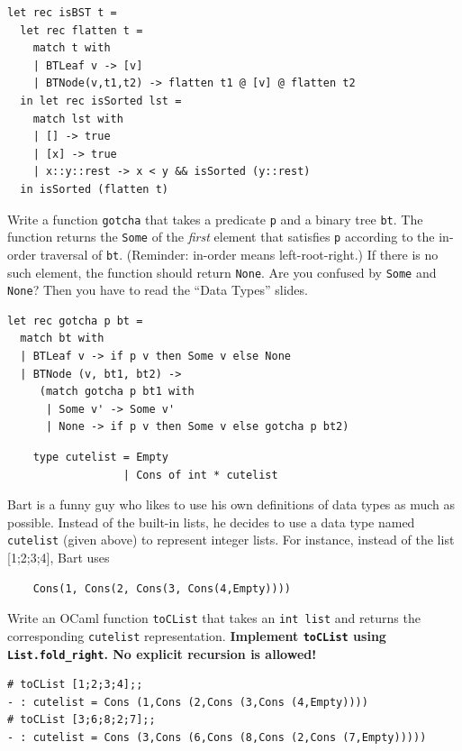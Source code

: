 \documentclass[addpoints]{exam}
\begin{document}
\begin{questions}
  \begin{solutionbox}{6cm}
    \begin{verbatim}
let rec isBST t =
  let rec flatten t =
    match t with
    | BTLeaf v -> [v]
    | BTNode(v,t1,t2) -> flatten t1 @ [v] @ flatten t2
  in let rec isSorted lst =
    match lst with
    | [] -> true
    | [x] -> true
    | x::y::rest -> x < y && isSorted (y::rest)
  in isSorted (flatten t)
    \end{verbatim}
  \end{solutionbox}

  \question
  Write a function \texttt{gotcha} that takes a predicate \texttt{p} and a binary tree
  \texttt{bt}. The function returns the \texttt{Some} of the \emph{first} element
  that satisfies \texttt{p} according to the in-order traversal of \texttt{bt}.
  (Reminder: in-order means left-root-right.)
  If there is no such element, the function should return \texttt{None}.
  Are you confused by \texttt{Some} and \texttt{None}?
  Then you have to read the ``Data Types'' slides.

  \begin{solutionbox}{4.5cm}
    \begin{verbatim}
let rec gotcha p bt =
  match bt with
  | BTLeaf v -> if p v then Some v else None
  | BTNode (v, bt1, bt2) ->
     (match gotcha p bt1 with
      | Some v' -> Some v'
      | None -> if p v then Some v else gotcha p bt2)
    \end{verbatim}
  \end{solutionbox}


  \vspace{1em}
  \vspace{1em}

  \begin{verbatim}
    type cutelist = Empty
                  | Cons of int * cutelist
  \end{verbatim}

  Bart is a funny guy who likes to use his own definitions
  of data types as much as possible.
  Instead of the built-in lists, he decides to use a data type
  named \texttt{cutelist} (given above) to represent integer lists.
  For instance, instead of the list [1;2;3;4], Bart uses
  \begin{verbatim}
    Cons(1, Cons(2, Cons(3, Cons(4,Empty))))
  \end{verbatim}

  \question
  Write an OCaml function \texttt{toCList} that takes
  an \texttt{int list} and returns the 
  corresponding \texttt{cutelist} representation.
  \textbf{Implement \texttt{toCList} using \texttt{List.fold\_right}.
    No explicit recursion is allowed!}
  \begin{verbatim}
# toCList [1;2;3;4];;
- : cutelist = Cons (1,Cons (2,Cons (3,Cons (4,Empty))))
# toCList [3;6;8;2;7];;
- : cutelist = Cons (3,Cons (6,Cons (8,Cons (2,Cons (7,Empty)))))
  \end{verbatim}


\end{questions}
\end{document}

